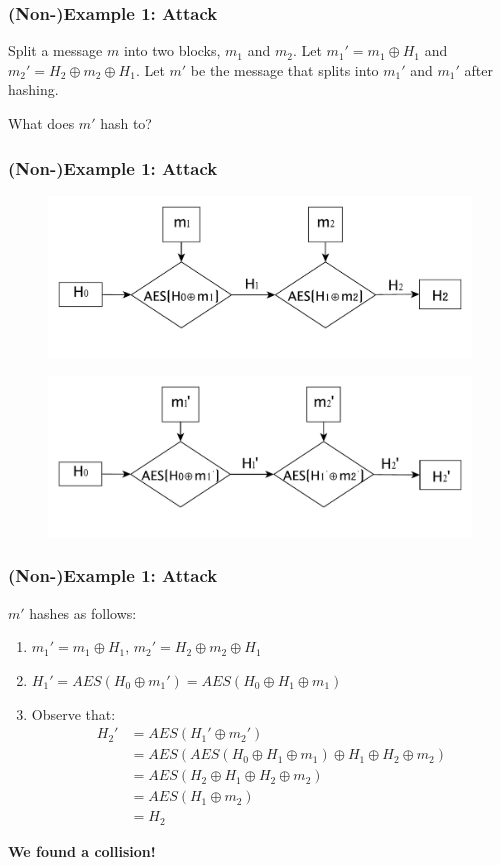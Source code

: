 \documentclass{beamer}
\newcommand{\<}{\langle}
\renewcommand{\>}{\rangle}
\begin{document}
\begin{frame}
\frametitle{(Non-)Example 1: Attack}

Split a message $m$ into two blocks, $m_1$ and $m_2$. Let $m_1' = m_1 \oplus H_1$ and $m_2' = H_2\oplus m_2\oplus H_1$. Let $m' $ be the message that splits into $m_1'$ and $m_1'$ after hashing.\newline

What does $m'$ hash to?
\end{frame}

\begin{frame}
\frametitle{(Non-)Example 1: Attack}

\begin{figure}
\includegraphics[scale=.5]{IMG/nonexample1}
\end{figure}

\begin{figure}
\includegraphics[scale=.5]{IMG/nonexample2}
\end{figure}
\end{frame}


\begin{frame}
\frametitle{(Non-)Example 1: Attack}

$m'$ hashes as follows:
\begin{enumerate}[1)]
\item $m_1' = m_1 \oplus H_1$, $m_2' = H_2\oplus m_2 \oplus H_1$
\item $H_1' = AES(H_0 \oplus m_1') = AES(H_0 \oplus H_1 \oplus m_1)$
\item Observe that:
\begin{align*}
H_2'& = AES(H_1' \oplus m_2')\\
	& = AES(AES(H_0 \oplus H_1 \oplus m_1)\oplus H_1\oplus H_2\oplus m_2)\\
	& = AES(H_2 \oplus H_1 \oplus H_2\oplus m_2)\\
	&= AES(H_1\oplus m_2) \\
	&= H_2
\end{align*}
\end{enumerate}
\textbf{We found a collision!}
\end{frame}
\end{document}
